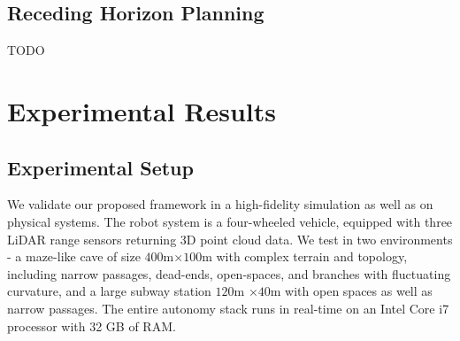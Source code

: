 \documentclass[letterpaper]{article} %
\newcommand{\ph}[1]{{\textbf{#1}:}} %
\begin{document}


\subsection{Receding Horizon Planning}

TODO



\section{Experimental Results}\label{sec:exp_results}









\subsection{Experimental Setup}





We validate our proposed framework in a high-fidelity simulation as well as on physical systems. The robot system is a four-wheeled vehicle, equipped with three LiDAR range sensors returning 3D point cloud data. We test in two environments - a maze-like cave of size $400$m$ \times 100$m with complex terrain and topology, including narrow passages, dead-ends, open-spaces, and branches with fluctuating curvature, and a large subway station $120$m $\times 40$m with open spaces as well as narrow passages.  The entire autonomy stack runs in real-time on an Intel Core i7 processor with 32 GB of RAM.
\end{document}
